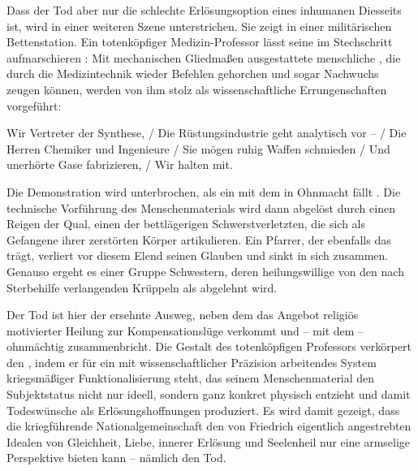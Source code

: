 Dass der Tod aber nur die schlechte Erlösungsoption eines inhumanen Diesseits
ist, wird in einer weiteren \Cite{traumartigen} Szene unterstrichen. Sie zeigt
\Cite{die Krüppel} in einer militärischen Bettenstation. Ein totenköpfiger
Medizin-Professor lässt seine \Cite{Musterexemplare} im Stechschritt
aufmarschieren : Mit mechanischen Gliedmaßen ausgestattete
menschliche
\Cite{Fleischrümpfe}, die durch die Medizintechnik wieder Befehlen gehorchen
und sogar Nachwuchs zeugen können, werden von ihm stolz als wissenschaftliche
Errungenschaften vorgeführt:

\begin{BlockQuote}
  Wir Vertreter der Synthese, / Die Rüstungsindustrie geht analytisch vor -- /
  Die Herren Chemiker und Ingenieure / Sie mögen ruhig Waffen schmieden / Und
  unerhörte Gase fabrizieren, / Wir halten mit.
\end{BlockQuote}
Die Demonstration wird unterbrochen, als ein \Cite{Hörer} mit dem
\Cite{Antlitz Friedrichs} in Ohnmacht fällt . Die technische
Vorführung des
Menschenmaterials wird dann abgelöst durch einen Reigen der Qual, einen
\Cite{Mischchor}  der bettlägerigen Schwerstverletzten, die
sich als Gefangene
ihrer zerstörten Körper artikulieren. Ein Pfarrer, der ebenfalls das
\Cite{Antlitz Friedrichs}  trägt, verliert vor diesem Elend
seinen Glauben und
sinkt in sich zusammen. Genauso ergeht es einer Gruppe Schwestern, deren
heilungswillige \Cite{Nächstenliebe} von den nach Sterbehilfe verlangenden
Krüppeln als \Cite{Flickwerk}  abgelehnt
wird.

Der Tod ist hier der ersehnte Ausweg, neben dem das Angebot religiös
motivierter Heilung zur Kompensationslüge verkommt und -- mit dem
\Cite{Antlitz Friedrichs} -- ohnmächtig zusammenbricht. Die Gestalt des
totenköpfigen Professors verkörpert den \Cite{Tod als Feind des Geistes}, indem
er für ein mit wissenschaftlicher Präzision arbeitendes System kriegsmäßiger
Funktionalisierung steht, das seinem Menschenmaterial den Subjektstatus nicht
nur ideell, sondern ganz konkret physisch entzieht und damit Todeswünsche als
Erlösungshoffnungen produziert. Es wird damit gezeigt, dass die kriegführende
Nationalgemeinschaft den von Friedrich eigentlich angestrebten Idealen von
Gleichheit, Liebe, innerer Erlösung und Seelenheil nur eine armselige
Perspektive bieten kann -- nämlich den Tod.

